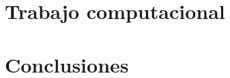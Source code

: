 \documentclass[12pt,t]{beamer}
\begin{document}

\section{Trabajo computacional}

\begin{frame}
 
\end{frame}


\section{Conclusiones}

\begin{frame}
 
\end{frame}


\maketitle
\end{document}
